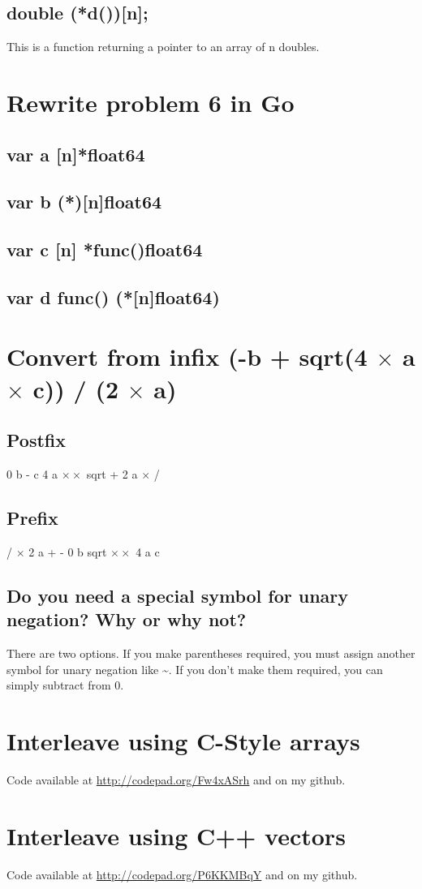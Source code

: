 \documentclass[11pt, oneside]{article}   	%
\begin{document}
\subsection{double (*d())[n];}
This is a function returning a pointer to an array of n doubles.

\section{Rewrite problem 6 in Go}
\subsection{var a [n]*float64}
\subsection{var b (*)[n]float64}
\subsection{var c [n] *func()float64}
\subsection{var d func() (*[n]float64)}

\section{Convert from infix (-b + sqrt(4 $\times$ a $\times$ c)) / (2 $\times$ a)}

\subsection{Postfix}
0 b -  c 4 a $\times \times$ sqrt + 2 a $\times$ /
\subsection{Prefix}
/ $\times$ 2 a + - 0 b sqrt $\times \times$ 4 a c
\subsection{Do you need a special symbol for unary negation? Why or why not?}
There are two options. If you make parentheses required, you must assign another symbol for unary negation like \textasciitilde. If you don't make them required, you can simply subtract from 0.

\section{Interleave using C-Style arrays}
Code available at \url{http://codepad.org/Fw4xASrh} and on my github.


\section{Interleave using C++ vectors}
Code available at \url{http://codepad.org/P6KKMBqY} and on my github.

\end{document}
